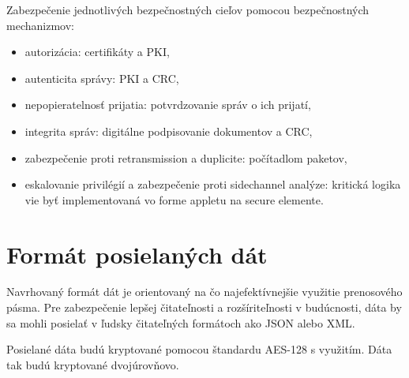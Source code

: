 \documentclass[12pt,a4wide,oneside,openright]{report}
\begin{document}
Zabezpečenie jednotlivých bezpečnostných cieľov pomocou bezpečnostných mechanizmov:
\singlespacing
\begin{itemize}
	\item autorizácia: certifikáty a PKI,
	\item autenticita správy: PKI a CRC,
	\item nepopieratelnosť prijatia: potvrdzovanie správ o ich prijatí,
	\item integrita správ: digitálne podpisovanie dokumentov a CRC,
	\item zabezpečenie proti retransmission a duplicite: počítadlom paketov,
	\item eskalovanie privilégií a zabezpečenie proti sidechannel analýze: kritická logika vie byť implementovaná vo forme appletu na secure elemente.
\end{itemize}
\onehalfspacing


\section{Formát posielaných dát}
Navrhovaný formát dát je orientovaný na čo najefektívnejšie využitie prenosového pásma. 
Pre zabezpečenie lepšej čitateľnosti a rozšíriteľnosti v budúcnosti, dáta by sa mohli posielať v ľudsky čitateľných formátoch ako JSON alebo XML.

Posielané dáta budú kryptované pomocou štandardu AES-128 s využitím. Dáta tak budú kryptované dvojúrovňovo.
\end{document}
